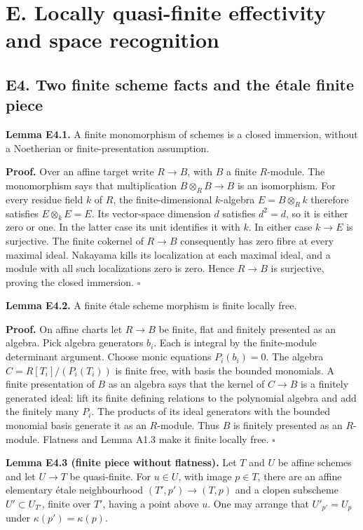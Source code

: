 \documentclass[11pt,a4paper,openany]{report}
\begin{document}
\section{E. Locally quasi-finite effectivity and space recognition}\label{AG-RG-S04-e.-locally-quasi-finite-effectivity-and-space-recognition}

\subsection{E4. Two finite scheme facts and the étale finite piece}\label{AG-RG-S04-e4.-two-finite-scheme-facts-and-the-uxe9tale-finite-piece}

\textbf{Lemma E4.1.} A finite monomorphism of schemes is a closed immersion, without a Noetherian or finite-presentation assumption.

\textbf{Proof.} Over an affine target write \(R\to B\), with \(B\) a finite \(R\)-module. The monomorphism says that multiplication \(B\otimes_R B\to B\) is an isomorphism. For every residue field \(k\) of \(R\), the finite-dimensional \(k\)-algebra \(E=B\otimes_R k\) therefore satisfies \(E\otimes_k E=E\). Its vector-space dimension \(d\) satisfies \(d^2=d\), so it is either zero or one. In the latter case its unit identifies it with \(k\). In either case \(k\to E\) is surjective. The finite cokernel of \(R\to B\) consequently has zero fibre at every maximal ideal. Nakayama kills its localization at each maximal ideal, and a module with all such localizations zero is zero. Hence \(R\to B\) is surjective, proving the closed immersion. \(\square\)

\textbf{Lemma E4.2.} A finite étale scheme morphism is finite locally free.

\textbf{Proof.} On affine charts let \(R\to B\) be finite, flat and finitely presented as an algebra. Pick algebra generators \(b_i\). Each is integral by the finite-module determinant argument. Choose monic equations \(P_i(b_i)=0\). The algebra \(C=R[T_i]/(P_i(T_i))\) is finite free, with basis the bounded monomials. A finite presentation of \(B\) as an algebra says that the kernel of \(C\to B\) is a finitely generated ideal: lift its finite defining relations to the polynomial algebra and add the finitely many \(P_i\). The products of its ideal generators with the bounded monomial basis generate it as an \(R\)-module. Thus \(B\) is finitely presented as an \(R\)-module. Flatness and Lemma A1.3 make it finite locally free. \(\square\)

\textbf{Lemma E4.3 (finite piece without flatness).} Let \(T\) and \(U\) be affine schemes and let \(U\to T\) be quasi-finite. For \(u\in U\), with image \(p\in T\), there are an affine elementary étale neighbourhood \((T',p')\to(T,p)\) and a clopen subscheme \(U'\subset U_{T'}\), finite over \(T'\), having a point above \(u\). One may arrange that \(U'_{p'}=U_p\) under \(\kappa(p')=\kappa(p)\).
\end{document}
